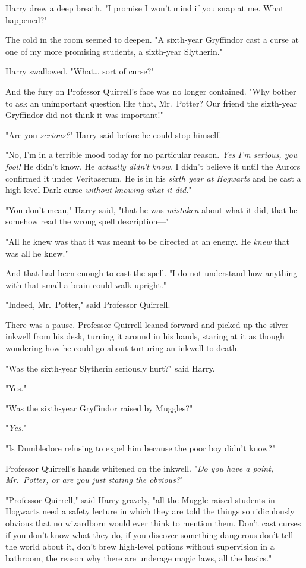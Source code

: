 Harry drew a deep breath. "I promise I won't mind if you snap at me. What 
happened?"

The cold in the room seemed to deepen. "A sixth-year Gryffindor cast a curse at 
one of my more promising students, a sixth-year Slytherin."

Harry swallowed. "What{\ldots} sort of curse?"

And the fury on Professor Quirrell's face was no longer contained. "Why bother 
to ask an unimportant question like that, Mr.~Potter? Our friend the sixth-year 
Gryffindor did not think it was important!"

"Are you \emph{serious?}" Harry said before he could stop himself.

"No, I'm in a terrible mood today for no particular reason. \emph{Yes I'm 
serious, you fool!} He didn't know. He \emph{actually didn't know.} I didn't 
believe it until the Aurors confirmed it under Veritaserum. He is in his 
\emph{sixth year at Hogwarts} and he cast a high-level Dark curse \emph{without 
knowing what it did.}"

"You don't mean," Harry said, "that he was \emph{mistaken} about what it did, 
that he somehow read the wrong spell description---"

"All he knew was that it was meant to be directed at an enemy. He \emph{knew} 
that was all he knew."

And that had been enough to cast the spell. "I do not understand how anything 
with that small a brain could walk upright."

"Indeed, Mr.~Potter," said Professor Quirrell.

There was a pause. Professor Quirrell leaned forward and picked up the silver 
inkwell from his desk, turning it around in his hands, staring at it as though 
wondering how he could go about torturing an inkwell to death.

"Was the sixth-year Slytherin seriously hurt?" said Harry.

"Yes."

"Was the sixth-year Gryffindor raised by Muggles?"

"\emph{Yes.}"

"Is Dumbledore refusing to expel him because the poor boy didn't know?"

Professor Quirrell's hands whitened on the inkwell. "\emph{Do you have a point, 
Mr.~Potter, or are you just stating the obvious?}"

"Professor Quirrell," said Harry gravely, "all the Muggle-raised students in 
Hogwarts need a safety lecture in which they are told the things so 
ridiculously obvious that no wizardborn would ever think to mention them. Don't 
cast curses if you don't know what they do, if you discover something dangerous 
don't tell the world about it, don't brew high-level potions without 
supervision in a bathroom, the reason why there are underage magic laws, all 
the basics."

